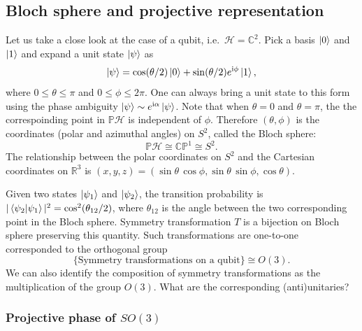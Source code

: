 \documentclass[
]{scrartcl}
\numberwithin{equation}{section}
\theoremstyle{definition}
\theoremstyle{definition}
\theoremstyle{definition}
\theoremstyle{definition}
\theoremstyle{remark}
\begin{document}
\hypertarget{bloch-sphere-and-projective-representation}{%
\subsection{Bloch sphere and projective representation}\label{bloch-sphere-and-projective-representation}}

Let us take a close look at the case of a qubit, i.e.~\(\mathcal{H} = \mathbb{C}^2\).
Pick a basis \(\ket{0}\) and \(\ket{1}\) and expand a unit state \(\ket{\psi}\) as
\begin{equation}
  \label{eq:psiexp}
  \ket{\psi} = \cos(\theta/2) \ket{0} + \sin(\theta/2)e^{\mathrm{i}\phi} \ket{1},
\end{equation}
where \(0\le \theta \le \pi\) and \(0 \le \phi \le 2\pi\).
One can always bring a unit state to this form using the phase ambiguity \(\ket{\psi}\sim e^{\mathrm{i}\alpha}\ket{\psi}\).
Note that when \(\theta = 0\) and \(\theta =\pi\), the the correspoinding point in \(\mathbb{P}\mathcal{H}\) is independent of \(\phi\). Therefore \((\theta,\phi)\) is the coordinates (polar and azimuthal angles) on \(S^2\), called the Bloch sphere:
\begin{equation}
  \label{eq:PHCP1}
  \mathbb{P}\mathcal{H} \cong \mathbb{CP}^1 \cong S^2.
\end{equation}
The relationship between the polar coordinates on \(S^2\) and the Cartesian coordinates on \(\mathbb{R}^3\) is \((x,y,z) = (\sin\theta\,\cos\phi,\sin\theta\,\sin\phi,\cos\theta)\).

Given two states \(\ket{\psi_1}\) and \(\ket{\psi_2}\), the transition probability is \(|\braket{\psi_2|\psi_1}|^2 = \cos^2(\theta_{12}/2)\), where \(\theta_{12}\) is the angle between the two corresponding point in the Bloch sphere.
Symmetry transformation \(T\) is a bijection on Bloch sphere preserving this quantity. Such transformations are one-to-one corresponded to the orthogonal group
\begin{equation}
  \label{eq:TisO3}
  \{\text{Symmetry transformations on a qubit}\} \cong O(3).
\end{equation}
We can also identify the composition of symmetry transformations as the multiplication of the group \(O(3)\).
What are the corresponding (anti)unitaries?

\hypertarget{projective-phase-of-so3}{%
\subsubsection{\texorpdfstring{Projective phase of \(SO(3)\)}{Projective phase of SO(3)}}\label{projective-phase-of-so3}}
\end{document}
